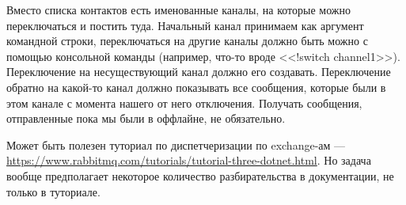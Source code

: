 \documentclass{../../text-style}
\begin{document}
Вместо списка контактов есть именованные каналы, на которые можно переключаться и постить туда. Начальный канал принимаем как аргумент командной строки, переключаться на другие каналы должно быть можно с помощью консольной команды (например, что-то вроде <<!switch channel1>>). Переключение на несуществующий канал должно его создавать. Переключение обратно на какой-то канал должно показывать все сообщения, которые были в этом канале с момента нашего от него отключения. Получать сообщения, отправленные пока мы были в оффлайне, не обязательно.

Может быть полезен туториал по диспетчеризации по exchange-ам --- \url{https://www.rabbitmq.com/tutorials/tutorial-three-dotnet.html}. Но задача вообще предполагает некоторое количество разбирательства в документации, не только в туториале.
\end{document}
